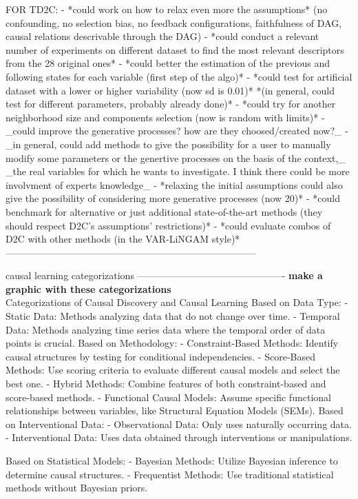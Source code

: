 FOR TD2C:
- *could work on how to relax even more the assumptions*
  (no confounding, no selection bias, no feedback configurations, faithfulness of DAG, causal relations descrivable through the DAG)
- *could conduct a relevant number of experiments on different dataset to find the most relevant descriptors from the 28 original ones*
- *could better the estimation of the previous and following states for each variable (first step of the algo)*
- *could test for artificial dataset with a lower or higher variability (now sd is 0.01)*
   *(in general, could test for different parameters, probably already done)* 
- *could try for another neighborhood size and components selection (now is random with limits)*
- _could improve the generative processes? how are they choosed/created now?_
- _in general, could add methods to give the possibility for a user to manually modify some parameters or the genertive processes on the basis of the context,_
  _the real variables for which he wants to investigate. I think there could be more involvment of experts knowledge_
- *relaxing the initial assumptions could also give the possibility of considering more generative processes (now 20)*
- *could benchmark for alternative or just additional state-of-the-art methods (they should respect D2C's assumptions' restrictions)*
- *could evaluate combos of D2C with other methods (in the VAR-LiNGAM style)*
------------------------------------------------------------------------------

causal learning categorizations ----------------------------------------------
\textbf{make a graphic with these categorizations}\\
Categorizations of Causal Discovery and Causal Learning
Based on Data Type:
- Static Data: Methods analyzing data that do not change over time.
- Temporal Data: Methods analyzing time series data where the temporal order of data points is crucial. 
Based on Methodology:
- Constraint-Based Methods: Identify causal structures by testing for conditional independencies.
- Score-Based Methods: Use scoring criteria to evaluate different causal models and select the best one.
- Hybrid Methods: Combine features of both constraint-based and score-based methods.
- Functional Causal Models: Assume specific functional relationships between variables, like Structural Equation Models (SEMs).
Based on Interventional Data:
- Observational Data: Only uses naturally occurring data.
- Interventional Data: Uses data obtained through interventions or manipulations.

Based on Statistical Models:
- Bayesian Methods: Utilize Bayesian inference to determine causal structures.
- Frequentist Methods: Use traditional statistical methods without Bayesian priors.

